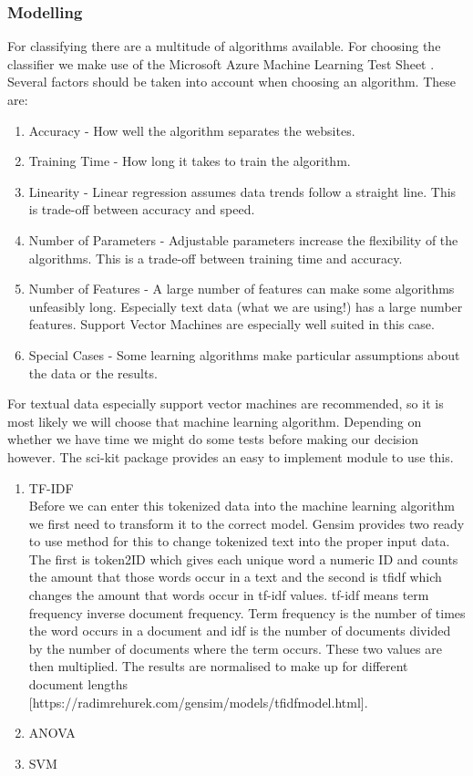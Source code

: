 \subsubsection{Modelling}
For classifying there are a multitude of algorithms available. For choosing the classifier we make use of the Microsoft Azure Machine Learning Test Sheet \cite{MLCheatSheet}. Several factors should be taken into account when choosing an algorithm. These are:
    \begin{enumerate}
        \item Accuracy - How well the algorithm separates the websites.
        \item Training Time - How long it takes to train the algorithm.
        \item Linearity - Linear regression assumes data trends follow a straight line. This is trade-off between accuracy and speed.
        \item Number of Parameters - Adjustable parameters increase the flexibility of the algorithms. This is a trade-off between training time and accuracy.
        \item Number of Features - A large number of features can make some algorithms unfeasibly long. Especially text data (what we are using!) has a large number features. Support Vector Machines are especially well suited in this case.
        \item Special Cases - Some learning algorithms make particular assumptions about the data or the results.
    \end{enumerate}
    
For textual data especially support vector machines are recommended, so it is most likely we will choose that machine learning algorithm. Depending on whether we have time we might do some tests before making our decision however. The sci-kit package\cite{scikit-learn} provides an easy to implement module to use this.

\begin{enumerate}
\item TF-IDF \\ 
Before we can enter this tokenized data into the machine learning algorithm we first need to transform it to the correct model. Gensim provides two ready to use method for this to change tokenized text into the proper input data. The first is token2ID which gives each unique word a numeric ID and counts the amount that those words occur in a text and the second is tfidf which changes the amount that words occur in tf-idf values. tf-idf means term frequency inverse document frequency. Term frequency is the number of times the word occurs in a document and idf is the number of documents divided by the number of documents where the term occurs. These two values are then multiplied. The results are normalised to make up for different document lengths [https://radimrehurek.com/gensim/models/tfidfmodel.html].
\item ANOVA

\item SVM
\end{enumerate}

